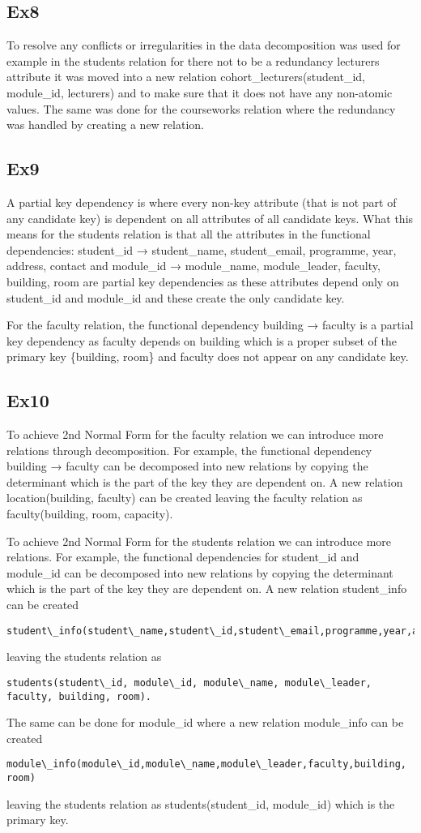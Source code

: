 \documentclass[12pt]{article}
\begin{document}
{{\subsection{Ex8}
To resolve any conflicts or irregularities in the data decomposition was used for example in the students relation for there not to be a redundancy lecturers attribute it was moved into a new relation cohort\_lecturers(student\_id, module\_id, lecturers) and to make sure that it does not have any non-atomic values. The same was done for the courseworks relation where the redundancy was handled by creating a new relation.
\subsection{Ex9}
A partial key dependency is where every non-key attribute (that is not part of any candidate
key) is dependent on all attributes of all candidate keys. What this means for the students relation is that all the attributes in the functional dependencies: student\_id → student\_name, student\_email, programme, year, address, contact and module\_id → module\_name, module\_leader, faculty, building, room are partial key dependencies as these attributes depend only on student\_id and module\_id and these create the only candidate key. 

For the faculty relation, the functional dependency building → faculty is a partial key dependency as faculty depends on building which is a proper subset of the primary key \{building, room\} and faculty does not appear on any candidate key. 
\subsection{Ex10}
To achieve 2nd Normal Form for the faculty relation we can introduce more relations through decomposition. For example, the functional dependency building → faculty can be decomposed into new relations by copying the determinant which is the part of the key they are dependent on. A new relation location(building, faculty) can be created leaving the faculty relation as faculty(building, room, capacity).

To achieve 2nd Normal Form for the students relation we can introduce more relations. For example, the functional dependencies for student\_id and module\_id can be decomposed into new relations by copying the determinant which is the part of the key they are dependent on. A new relation student\_info can be created 
\begin{verbatim}
student\_info(student\_name,student\_id,student\_email,programme,year,address,contact) 
\end{verbatim}
leaving the students relation as 
\begin{verbatim}
students(student\_id, module\_id, module\_name, module\_leader, faculty, building, room).
\end{verbatim}
The same can be done for module\_id where a new relation module\_info can be created 
\begin{verbatim}
module\_info(module\_id,module\_name,module\_leader,faculty,building, room)
\end{verbatim}
 leaving the students relation as students(student\_id, module\_id) which is the primary key.
}}
\end{document}
